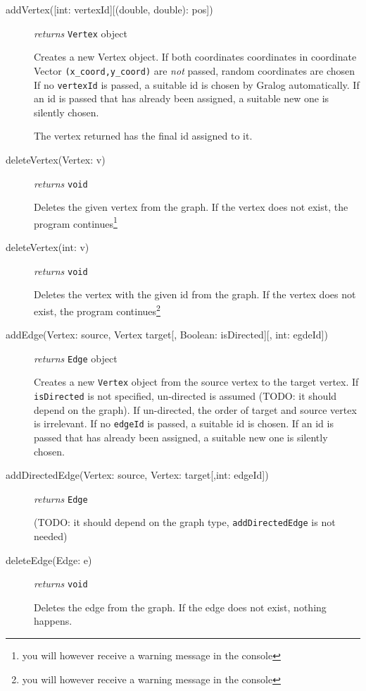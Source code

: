 \documentclass{article}
\begin{document}
\begin{description}
\item[addVertex({[int: vertexId]}{[(double, double): pos]})]\emph{returns}
  \texttt{Vertex} object

  Creates a new Vertex object. If both coordinates coordinates in coordinate Vector \texttt{(x\_coord,y\_coord)} are \textit{not} passed,
  random coordinates are chosen
  If no \texttt{vertexId} is passed, a suitable id is
  chosen by Gralog automatically. If an id is passed that has already
  been assigned, a suitable new one is silently chosen.
  
  The vertex returned has the final id assigned to it.

  
\item[deleteVertex(Vertex: v)] \emph{returns} \texttt{void}

Deletes the given vertex from the graph. If the vertex does not exist, the program continues\footnote{you will however receive a warning message in the console}


\item[deleteVertex(int: v)] \emph{returns} \texttt{void}

Deletes the vertex with the given id from the graph. If the vertex does not exist, the program continues\footnote{you will however receive a warning message in the console}

\item[addEdge(Vertex: source, Vertex target{[, Boolean: isDirected][,
    int: egdeId]})] \emph{returns} \texttt{Edge} object


Creates a new \texttt{Vertex} object from the source vertex to the
target vertex. If \texttt{isDirected} is not specified, un-directed is
assumed (TODO: it should depend on the graph). If un-directed, the
order of target and source vertex is irrelevant. If no \texttt{edgeId}
is passed, a suitable id is chosen. If an id is passed that has
already been assigned, a suitable new one is silently chosen.

\item[addDirectedEdge(Vertex: source, Vertex: target{[,int: edgeId]})]
  \emph{returns} \texttt{Edge}

(TODO: it should depend on the graph type, \texttt{addDirectedEdge} is
not needed)


\item[deleteEdge(Edge: e)] \emph{returns} \texttt{void}

Deletes the edge from the graph. If the edge does not exist, nothing
happens.


\end{description}
\end{document}
